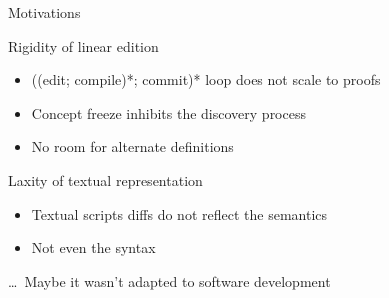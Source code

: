 \documentclass[ignorenonframetext,red]{beamer}
\begin{document}
\begin{frame}{Motivations}
  \begin{block}{Rigidity of linear edition}
    \begin{itemize}
    \item ((edit; compile)*; commit)* loop does not scale to proofs
    \item Concept freeze inhibits the discovery process
    \item No room for alternate definitions
    \end{itemize}
  \end{block}
  \pause
  \begin{block}{Laxity of textual representation}
    \begin{itemize}
    \item Textual scripts \textsf{diff}s do not reflect the semantics
    \item Not even the syntax
    \end{itemize}
  \end{block}
  \vspace{2em}
  \pause
  {\tiny \ldots\ Maybe it wasn't adapted to software development}
\end{frame}
\end{document}
